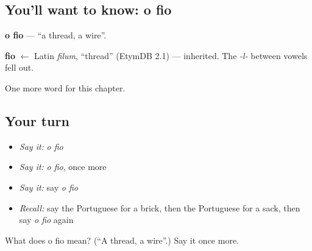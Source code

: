 \subsection*{You'll want to know: o fio}
\textbf{o fio} — \textquotedblleft{}a thread, a wire\textquotedblright{}.

\begin{cousinweb}
\textbf{fio} $\leftarrow$ Latin \emph{filum}, \textquotedblleft{}thread\textquotedblright{} (EtymDB 2.1) — inherited. The \emph{-l-} between vowels fell out.
\end{cousinweb}

\begin{grammarlens}[title={What you've built}]
One more word for this chapter.
\end{grammarlens}

\subsection*{Your turn}
\begin{itemize}
\raggedright
  \item \emph{Say it:} \emph{o fio}
  \item \emph{Say it:} \emph{o fio}, once more
  \item \emph{Say it:} say \emph{o fio}
  \item \emph{Recall:} say the Portuguese for a brick, then the Portuguese for a sack, then say \emph{o fio} again
\end{itemize}

\begin{tcolorbox}[breakable,colback=teal!4,colframe=teal!35!black,title={Before you move on}]
What does o fio mean? (\textquotedblleft{}A thread, a wire\textquotedblright{}.) Say it once more.
\end{tcolorbox}

